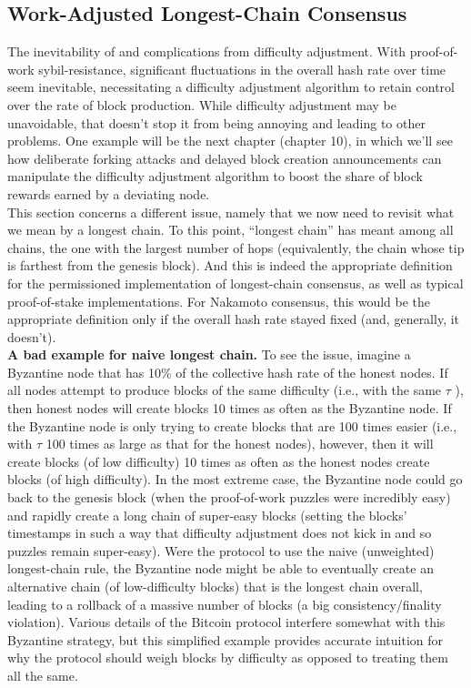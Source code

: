 \subsection{Work-Adjusted Longest-Chain Consensus}
The inevitability of and complications from difficulty adjustment. With proof-of-work sybil-resistance, significant fluctuations in the overall hash rate over time seem inevitable, necessitating a difficulty adjustment algorithm to retain control over the rate of block production. While difficulty adjustment may be unavoidable, that doesn't stop it
from being annoying and leading to other problems. One example will be the next chapter
(chapter 10), in which we’ll see how deliberate forking attacks and delayed block creation
announcements can manipulate the difficulty adjustment algorithm to boost the share
of block rewards earned by a deviating node.\\
This section concerns a different issue, namely that we now need to revisit what we mean
by a longest chain. To this point, “longest chain” has meant among
all chains, the one with the largest number of hops (equivalently, the chain whose tip is farthest
from the genesis block). And this is indeed the appropriate definition for the permissioned
implementation of longest-chain consensus, as well as typical proof-of-stake implementations.
For Nakamoto consensus, this would be the appropriate definition only if the overall hash rate
stayed fixed (and, generally, it doesn't).\\

\noindent
\textbf{A bad example for naive longest chain.} To see the issue, imagine a Byzantine node
that has 10\% of the collective hash rate of the honest nodes. If all nodes attempt to produce
blocks of the same difficulty (i.e., with the same $\tau$ ), then honest nodes will create blocks 10
times as often as the Byzantine node. If the Byzantine node is only trying to create blocks
that are 100 times easier (i.e., with $\tau$ 100 times as large as that for the honest nodes),
however, then it will create blocks (of low difficulty) 10 times as often as the honest nodes
create blocks (of high difficulty). In the most extreme case, the Byzantine node could go
back to the genesis block (when the proof-of-work puzzles were incredibly easy)
and rapidly create a long chain of super-easy blocks (setting the blocks’ timestamps in such
a way that difficulty adjustment does not kick in and so puzzles remain super-easy). Were
the protocol to use the naive (unweighted) longest-chain rule, the Byzantine node might be
able to eventually create an alternative chain (of low-difficulty blocks) that is the longest chain
overall, leading to a rollback of a massive number of blocks (a big consistency/finality
violation). Various details of the Bitcoin protocol interfere somewhat with this Byzantine strategy, but this simplified example provides accurate intuition for why the protocol should weigh blocks by difficulty as opposed
to treating them all the same.\\
\\

